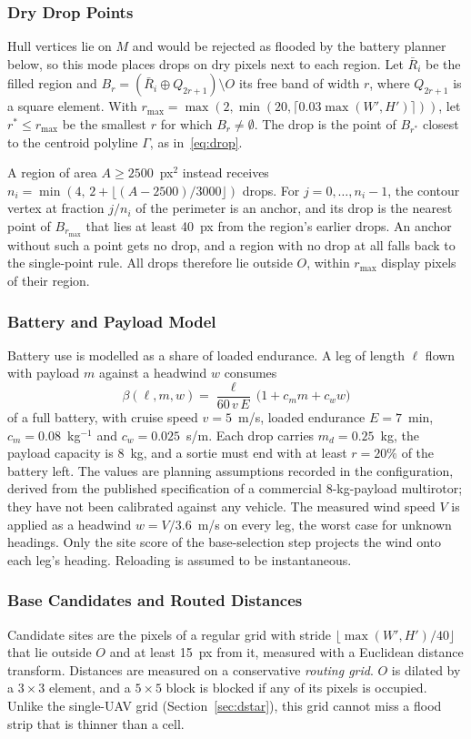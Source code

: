 \subsubsection{Dry Drop Points}
Hull vertices lie on $M$ and would be rejected as flooded by the battery planner below, so this mode places drops on dry pixels next to each region. Let $\bar R_i$ be the filled region and $B_r=(\bar R_i\oplus Q_{2r+1})\setminus O$ its free band of width $r$, where $Q_{2r+1}$ is a square element. With $r_{\max}=\max(2,\min(20,\lceil0.03\max(W',H')\rceil))$, let $r^\ast\le r_{\max}$ be the smallest $r$ for which $B_r\neq\emptyset$. The drop is the point of $B_{r^\ast}$ closest to the centroid polyline $\Gamma$, as in~\eqref{eq:drop}.

A region of area $A\ge2500$~px$^2$ instead receives $n_i=\min(4,\,2+\lfloor(A-2500)/3000\rfloor)$ drops. For $j=0,\dots,n_i-1$, the contour vertex at fraction $j/n_i$ of the perimeter is an anchor, and its drop is the nearest point of $B_{r_{\max}}$ that lies at least 40~px from the region's earlier drops. An anchor without such a point gets no drop, and a region with no drop at all falls back to the single-point rule. All drops therefore lie outside $O$, within $r_{\max}$ display pixels of their region.

\subsubsection{Battery and Payload Model}
Battery use is modelled as a share of loaded endurance. A leg of length $\ell$ flown with payload $m$ against a headwind $w$ consumes
\begin{equation}
\beta(\ell,m,w)=\frac{\ell}{60\,v\,E}\,\big(1+c_m m+c_w w\big)
\label{eq:battery}
\end{equation}
of a full battery, with cruise speed $v=5$~m/s, loaded endurance $E=7$~min, $c_m=0.08$~kg$^{-1}$ and $c_w=0.025$~s/m. Each drop carries $m_d=0.25$~kg, the payload capacity is 8~kg, and a sortie must end with at least $r=20\%$ of the battery left. The values are planning assumptions recorded in the configuration, derived from the published specification of a commercial 8-kg-payload multirotor; they have not been calibrated against any vehicle. The measured wind speed $V$ is applied as a headwind $w=V/3.6$~m/s on every leg, the worst case for unknown headings. Only the site score of the base-selection step projects the wind onto each leg's heading. Reloading is assumed to be instantaneous.

\subsubsection{Base Candidates and Routed Distances}
Candidate sites are the pixels of a regular grid with stride $\lfloor\max(W',H')/40\rfloor$ that lie outside $O$ and at least 15~px from it, measured with a Euclidean distance transform. Distances are measured on a conservative \emph{routing grid}. $O$ is dilated by a $3\times3$ element, and a $5\times5$ block is blocked if any of its pixels is occupied. Unlike the single-UAV grid (Section~\ref{sec:dstar}), this grid cannot miss a flood strip that is thinner than a cell.

